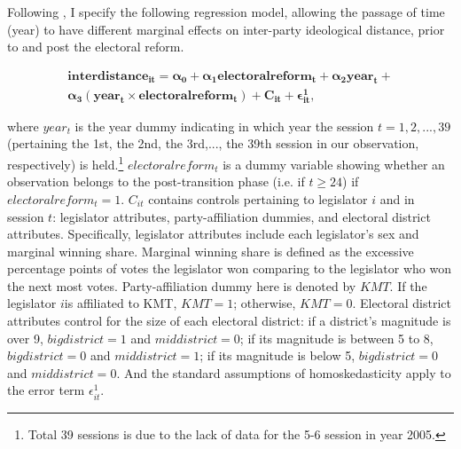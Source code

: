 Following \citet{Catalinac2017}, I specify the following regression model, allowing the passage of time (year) to have different marginal effects on inter-party ideological distance, prior to and post the electoral reform.

\begin{align}
\mathbf{interdistance_{it}=\alpha_{0}+\alpha_{1}electoralreform_{t}+\alpha_{2}year_{t}+}\nonumber \\
\mathbf{\alpha_{3}(year_{t}\times electoralreform_{t})+C_{it}+\epsilon_{it}^{1},}\label{eq:interdistance}
\end{align}

\noindent where $year_{t}$ is the year dummy indicating in which year the session $t=1,2,...,39$ (pertaining the 1st, the 2nd, the 3rd,..., the 39th session in our observation, respectively) is held.\footnote{Total 39 sessions is due to the lack of data for the 5-6 session in year 2005.} $electoralreform_{t}$ is a dummy variable showing whether an observation belongs to the post-transition phase (i.e. if $t\geq24$) if $electoralreform_{t}=1$. $C_{it}$ contains controls pertaining to legislator $i$ and in session $t$: legislator attributes, party-affiliation dummies, and electoral district attributes. Specifically, legislator attributes include each legislator's sex and marginal winning share. Marginal winning share is defined as the excessive percentage points of votes the legislator won comparing to the legislator who won the next most votes. Party-affiliation dummy here is denoted by $KMT$. If the legislator $i$is affiliated to KMT, $KMT=1$; otherwise, $KMT=0$. Electoral district attributes control for the size of each electoral district: if a district's magnitude is over 9, $bigdistrict=1$ and $middistrict=0$; if its magnitude is between 5 to 8, $bigdistrict=0$ and $middistrict=1$; if its magnitude is below 5, $bigdistrict=0$ and $middistrict=0$. And the standard assumptions of homoskedasticity apply to the error term $\epsilon_{it}^{1}$.



